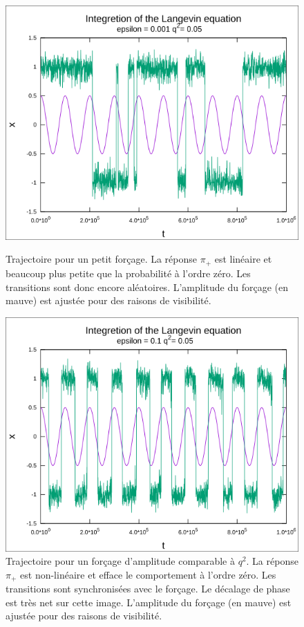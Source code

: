 \begin{figure}[p]
	\centering
	
	\includegraphics[width=0.8\linewidth]{figures/trajectory_random}
	\caption{Trajectoire pour un petit forçage. La réponse $\pi_+$ est linéaire et beaucoup plus petite que la probabilité à l'ordre zéro. Les transitions sont donc encore aléatoires. L'amplitude du forçage (en mauve) est ajustée pour des raisons de visibilité.}
	\label{fig:trajectory_random}
	
	\includegraphics[width=0.8\linewidth]{figures/trajectory_resonant}
	\caption{Trajectoire pour un forçage d'amplitude comparable à $q^2$. La réponse $\pi_+$ est non-linéaire et efface le comportement à l'ordre zéro. Les transitions sont synchronisées avec le forçage. Le décalage de phase est très net sur cette image. L'amplitude du forçage (en mauve) est ajustée pour des raisons de visibilité.}
	\label{fig:trajectory_resonant}
\end{figure}

